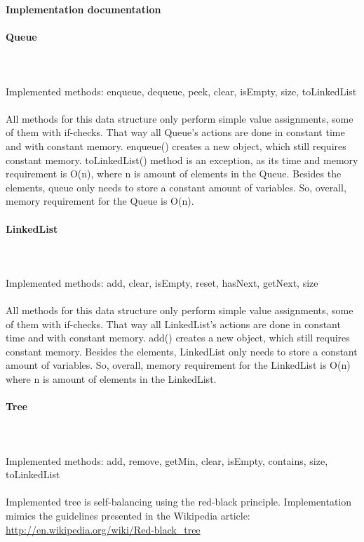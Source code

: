 \documentclass[a4paper,12pt]{article}
\begin{document}
\centerline{\huge \textbf{Implementation documentation}} \hspace*{\fill}

\paragraph{\large Queue} \hspace{0pt} \\
\\
Implemented methods: enqueue, dequeue, peek, clear, isEmpty, size, toLinkedList\\
\\
All methods for this data structure only perform simple value assignments, some of them with if-checks. That way all Queue's actions are done in constant time and with constant memory. enqueue() creates a new object, which still requires constant memory. toLinkedList() method is an exception, as its time and memory requirement is O(n), where n is amount of elements in the Queue. Besides the elements, queue only needs to store a constant amount of variables. So, overall, memory requirement for the Queue is O(n).
\\

\paragraph{\large LinkedList} \hspace{0pt} \\
\\
Implemented methods: add, clear, isEmpty, reset, hasNext, getNext, size\\
\\
All methods for this data structure only perform simple value assignments, some of them with if-checks. That way all LinkedList's actions are done in constant time and with constant memory. add() creates a new object, which still requires constant memory. Besides the elements, LinkedList only needs to store a constant amount of variables. So, overall, memory requirement for the LinkedList is O(n) where n is amount of elements in the LinkedList.
\\
\paragraph{\large Tree} \hspace{0pt} \\
\\
Implemented methods: add, remove, getMin, clear, isEmpty, contains, size, toLinkedList\\
\\
Implemented tree is self-balancing using the red-black principle. Implementation mimics the guidelines presented in the Wikipedia article: \url{http://en.wikipedia.org/wiki/Red-black_tree}\\
\end{document}
